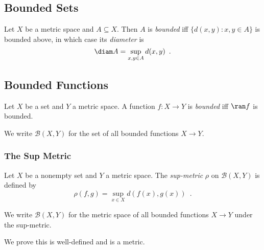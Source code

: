 \subsection{Bounded Sets}

\begin{df}[Bounded]
  Let $X$ be a metric space and $A \subseteq X$. Then $A$ is \emph{bounded}
  iff $\{ d(x, y) : x, y \in A \}$ is bounded above, in which case its
  \emph{diameter} is
  \[ \diam A = \sup_{x, y \in A} d(x, y) \enspace . \]
\end{df}

\subsection{Bounded Functions}

\begin{df}
Let $X$ be a set and $Y$ a metric space. A function $f : X \rightarrow Y$ is \emph{bounded} iff
$\ran f$ is bounded.

We write $\mathcal{B}(X, Y)$ for the set of all bounded functions $X \rightarrow Y$.
\end{df}

\subsubsection{The Sup Metric}

\begin{df}
  Let $X$ be a nonempty set and $Y$ a metric space. The \emph{sup-metric} $\rho$ on $\mathcal{B}(X, Y)$ is defined by
  \[ \rho(f, g) = \sup_{x \in X} d(f(x), g(x)) \enspace . \]

  We write $\mathcal{B}(X, Y)$ for the metric space of all bounded functions $X \rightarrow Y$ under the sup-metric.

  We prove this is well-defined and is a metric.
\end{df}

